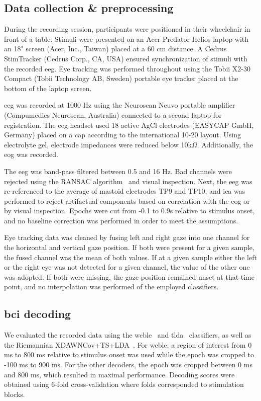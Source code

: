 \subsection{Data collection \& preprocessing}

During the recording session, participants were positioned in their wheelchair in front of a table.
Stimuli were presented on an Acer Predator Helios laptop with an 18" screen (Acer,
Inc., Taiwan) placed at a 60 cm distance.
A Cedrus StimTracker (Cedrus Corp., CA, USA) ensured synchronization of stimuli with the
recorded \ac{eeg}.
Eye tracking was performed throughout using the Tobii X2-30 Compact (Tobii
Technology AB, Sweden) portable eye tracker placed at the bottom of the laptop screen.

\Ac{eeg} was recorded at 1000 Hz using the Neuroscan Neuvo portable amplifier (Compumedics Neuroscan,
Australia) connected to a second laptop for registration.
The \ac{eeg} headset used 18 active AgCl electrodes (EASYCAP GmbH, Germany) placed on a cap
according to the international 10-20 layout.
Using electrolyte gel, electrode impedances were reduced below 10k$\Omega$.
Additionally, the \ac{eog} was recorded.

The \ac{eeg} was band-pass filtered between 0.5 and 16 Hz.
Bad channels were rejected using the RANSAC algorithm~\cite{Fischler1981}
and visual inspection.
Next, the \ac{eeg} was re-referenced to the average of mastoid electrodes TP9
and TP10, and \ac{ica} was performed to reject artifactual components based on
correlation with the \ac{eog} or by visual inspection.
Epochs were cut from -0.1 to 0.9s relative to stimulus onset, and no baseline
correction was performed in order to meet the assumptions.

Eye tracking data was cleaned by fusing left and right gaze into one channel
for the horizontal and vertical gaze position.
If both were present for a given sample, the fused channel was the mean of both
values.
If at a given sample either the left or the right eye was not detected for a
given channel, the value of the other one was adopted.
If both were missing, the gaze position remained unset at that time point, and no
interpolation was performed of the employed classifiers.

\subsection{\Acs{bci} decoding}

We evaluated the recorded data using the \ac{wcble}~\cite{VanDenKerchove2024}
and \ac{tlda}~\cite{Sosulski2022}
classifiers, as well as the Riemannian XDAWNCov+TS+LDA~\cite{Cecotti2017}.
For \ac{wcble}, a region of interest from 0 ms to 800 ms relative to stimulus
onset was used while the epoch was cropped to -100 ms to 900 ms. For the other
decoders, the epoch was cropped between 0 ms and 800 ms, which resulted in maximal
performance.
Decoding scores were obtained using 6-fold cross-validation where folds corresponded to
stimulation blocks.

